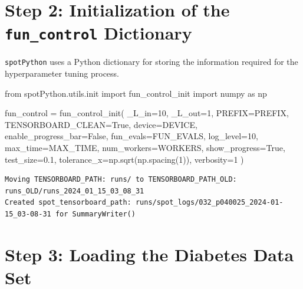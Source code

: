 \documentclass[
  letterpaper,
  DIV=11,
  numbers=noendperiod]{scrreprt}
\newenvironment{Shaded}{\begin{snugshade}}{\end{snugshade}}
\newcommand{\DecValTok}[1]{\textcolor[rgb]{0.68,0.00,0.00}{#1}}
\newcommand{\FloatTok}[1]{\textcolor[rgb]{0.68,0.00,0.00}{#1}}
\newcommand{\ImportTok}[1]{\textcolor[rgb]{0.00,0.46,0.62}{#1}}
\newcommand{\NormalTok}[1]{\textcolor[rgb]{0.00,0.23,0.31}{#1}}
\newcommand{\OperatorTok}[1]{\textcolor[rgb]{0.37,0.37,0.37}{#1}}
\newcommand{\VariableTok}[1]{\textcolor[rgb]{0.07,0.07,0.07}{#1}}
\begin{document}
\section{\texorpdfstring{Step 2: Initialization of the
\texttt{fun\_control}
Dictionary}{Step 2: Initialization of the fun\_control Dictionary}}\label{step-2-initialization-of-the-fun_control-dictionary-1}

\texttt{spotPython} uses a Python dictionary for storing the information
required for the hyperparameter tuning process.

\begin{Shaded}
\begin{Highlighting}[]
\ImportTok{from}\NormalTok{ spotPython.utils.init }\ImportTok{import}\NormalTok{ fun\_control\_init}
\ImportTok{import}\NormalTok{ numpy }\ImportTok{as}\NormalTok{ np}

\NormalTok{fun\_control }\OperatorTok{=}\NormalTok{ fun\_control\_init(}
\NormalTok{    \_L\_in}\OperatorTok{=}\DecValTok{10}\NormalTok{,}
\NormalTok{    \_L\_out}\OperatorTok{=}\DecValTok{1}\NormalTok{,}
\NormalTok{    PREFIX}\OperatorTok{=}\NormalTok{PREFIX,}
\NormalTok{    TENSORBOARD\_CLEAN}\OperatorTok{=}\VariableTok{True}\NormalTok{,}
\NormalTok{    device}\OperatorTok{=}\NormalTok{DEVICE,}
\NormalTok{    enable\_progress\_bar}\OperatorTok{=}\VariableTok{False}\NormalTok{,}
\NormalTok{    fun\_evals}\OperatorTok{=}\NormalTok{FUN\_EVALS,}
\NormalTok{    log\_level}\OperatorTok{=}\DecValTok{10}\NormalTok{,}
\NormalTok{    max\_time}\OperatorTok{=}\NormalTok{MAX\_TIME,}
\NormalTok{    num\_workers}\OperatorTok{=}\NormalTok{WORKERS,}
\NormalTok{    show\_progress}\OperatorTok{=}\VariableTok{True}\NormalTok{,}
\NormalTok{    test\_size}\OperatorTok{=}\FloatTok{0.1}\NormalTok{,}
\NormalTok{    tolerance\_x}\OperatorTok{=}\NormalTok{np.sqrt(np.spacing(}\DecValTok{1}\NormalTok{)),}
\NormalTok{    verbosity}\OperatorTok{=}\DecValTok{1}
\NormalTok{    )}
\end{Highlighting}
\end{Shaded}

\begin{verbatim}
Moving TENSORBOARD_PATH: runs/ to TENSORBOARD_PATH_OLD: runs_OLD/runs_2024_01_15_03_08_31
Created spot_tensorboard_path: runs/spot_logs/032_p040025_2024-01-15_03-08-31 for SummaryWriter()
\end{verbatim}

\section{Step 3: Loading the Diabetes Data
Set}\label{step-3-loading-the-diabetes-data-set-1}
\end{document}
